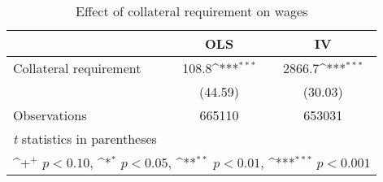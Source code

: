 \begin{table}[htbp]\centering
\def\sym#1{\ifmmode^{#1}\else\(^{#1}\)\fi}
\caption{Effect of collateral requirement on wages}
\begin{tabular}{l*{2}{c}}
\toprule
                    &\multicolumn{1}{c}{OLS}&\multicolumn{1}{c}{IV}\\
\midrule
Collateral requirement&       108.8\sym{***}&      2866.7\sym{***}\\
                    &     (44.59)         &     (30.03)         \\
\midrule
Observations        &      665110         &      653031         \\
\bottomrule
\multicolumn{3}{l}{\footnotesize \textit{t} statistics in parentheses}\\
\multicolumn{3}{l}{\footnotesize \sym{+} \(p<0.10\), \sym{*} \(p<0.05\), \sym{**} \(p<0.01\), \sym{***} \(p<0.001\)}\\
\end{tabular}
\end{table}
